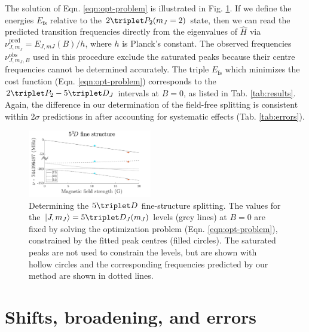 The solution of Eqn. \ref{eqn:opt-problem} is illustrated in Fig. \ref{fig:fitting_3D}. If we define the energies $E_{\textrm{fs}}$ relative to the $2\triplet P_2(m_J=2)$ state, then we can read the predicted transition frequencies directly from the eigenvalues of $\hat{H}$ via $\nu_{J,m_J}^{\textrm{pred}}=E_{J,mJ}(B)/h$, where $h$ is Planck's constant. The observed frequencies $\nu_{J,m_J,B}^{\textrm{obs}}$ used in this procedure exclude the saturated peaks because their centre frequencies cannot be determined accurately. The triple $E_{\textrm{fs}}$ which minimizes the cost function (Eqn. \ref{eqn:opt-problem}) corresponds to the $2\triplet P_2 - 5\triplet D_J$ intervals at $B=0$, as listed in Tab. \ref{tab:results}. Again, the difference in our determination of the field-free splitting is consistent within 2$\sigma$ predictions in \cite{Drake07} after accounting for systematic effects (Tab. \ref{tab:errors}). 

\begin{figure}[t]
    \centering
    \includegraphics[width=0.48\textwidth]{fig/spectroscopy/fitting-lines-eps-converted-to.pdf}
    \caption{Determining the $5\triplet D$ fine-structure splitting. The values for the $|J,m_J\rangle=5\triplet D_J(m_J)$ levels (grey lines) at $B=0$ are fixed by solving the optimization problem (Eqn. \ref{eqn:opt-problem}), constrained by the fitted peak centres (filled circles). The saturated peaks are not used to constrain the levels, but are shown with hollow circles and the corresponding frequencies predicted by our method are shown in dotted lines.}
    \label{fig:fitting_3D}
\end{figure}

\section{Shifts, broadening, and errors}

